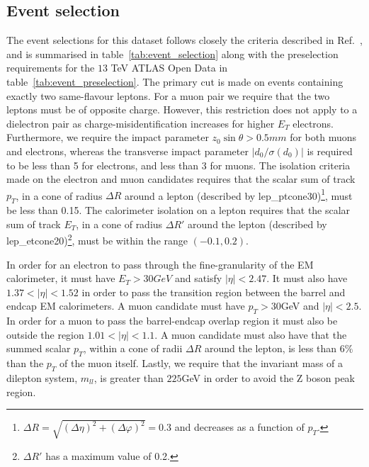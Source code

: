 \documentclass[12pt,a4paper]{amsart}
\begin{document}
\subsection{Event selection}
The event selections for this dataset follows closely the criteria described in Ref.~\cite{dilepton_selection}, and is summarised in table~\ref{tab:event_selection} along with the preselection requirements for the $13$ TeV ATLAS Open Data in table~\ref{tab:event_preselection}. The primary cut is made on events containing exactly two same-flavour leptons. For a muon pair we require that the two leptons must be of opposite charge. However, this restriction does not apply to a dielectron pair as charge-misidentification increases for higher $E_T$ electrons. Furthermore, we require the impact parameter $z_0\sin\theta > 0.5\si{mm}$ for both muons and electrons, whereas the transverse impact parameter $|d_0/\sigma(d_0)|$ is required to be less than 5 for electrons, and less than 3 for muons. The isolation criteria made on the electron and muon candidates requires that the scalar sum of track $p_T$, in a cone of radius $\Delta R$ around a lepton (described by lep\_ptcone30)\footnote{$\Delta R = \sqrt{(\Delta \eta)^2 + (\Delta \varphi)^2} = 0.3$ and decreases as a function of $p_T$.}, must be less than 0.15. The calorimeter isolation on a lepton requires that the scalar sum of track $E_T$, in a cone of radius $\Delta R'$ around the lepton (described by lep\_etcone20)\footnote{$\Delta R'$ has a maximum value of 0.2.}, must be within the range $(-0.1, 0.2)$.

In order for an electron to pass through the fine-granularity of the EM calorimeter, it must have $E_T > 30\si{GeV}$ and satisfy $|\eta| < 2.47$. It must also have $1.37 < |\eta| < 1.52$ in order to pass the transition region between the barrel and endcap EM calorimeters. A muon candidate must have $p_T > 30$GeV and $|\eta| < 2.5$. In order for a muon to pass the barrel-endcap overlap region it must also be outside the region $1.01 < |\eta| < 1.1$. A muon candidate must also have that the summed scalar $p_T$, within a cone of radii $\Delta R$ around the lepton, is less than $6\%$ than the $p_T$ of the muon itself. Lastly, we require that the invariant mass of a dilepton system, $m_{ll}$, is greater than $225$GeV in order to avoid the Z boson peak region.
\end{document}
